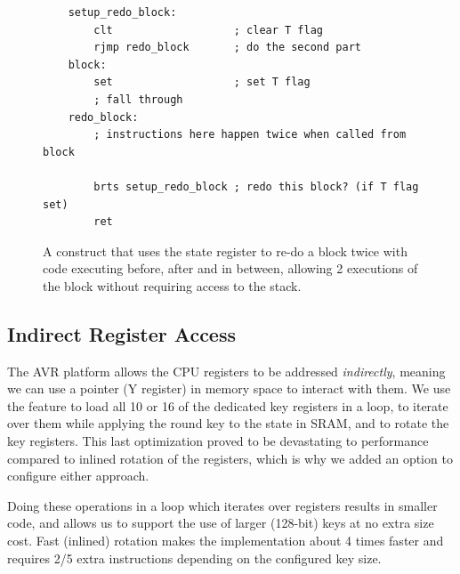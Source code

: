 \documentclass[11pt]{llncs2e} %
\begin{document}
\begin{figure}[H]
\centering
	\begin{lstlisting}
	setup_redo_block:
		clt                   ; clear T flag
		rjmp redo_block       ; do the second part
	block:
		set                   ; set T flag
		; fall through
	redo_block:
		; instructions here happen twice when called from block

		brts setup_redo_block ; redo this block? (if T flag set)
		ret
	\end{lstlisting}
	\caption{\footnotesize A construct that uses the state register to re-do a block twice with code executing before, after and in between, allowing 2 executions of the block without requiring access to the stack.}
\label{sreg_redo}
\end{figure}




\subsection{Indirect Register Access}
\label{indirect}
The AVR platform allows the CPU registers to be addressed \textit{indirectly}, meaning we can use a pointer (Y register) in memory space to interact with them.
We use the feature to load all 10 or 16 of the dedicated key registers in a loop, to iterate over them while applying the round key to the state in SRAM, and to rotate the key registers.
This last optimization proved to be devastating to performance compared to inlined rotation of the registers, which is why we added an option to configure either approach.

Doing these operations in a loop which iterates over registers results in smaller code, and allows us to support the use of larger (128-bit) keys at no extra size cost.
Fast (inlined) rotation makes the implementation about 4 times faster and requires 2/5 extra instructions depending on the configured key size.
\end{document}
